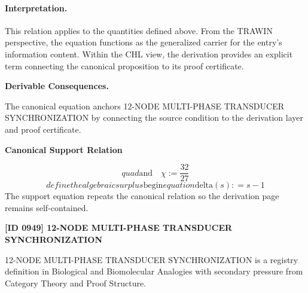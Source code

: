 \paragraph{Interpretation.}
This relation applies to the quantities defined above. From the TRAWIN perspective, the equation functions as the generalized carrier for the entry’s information content. Within the CHL view, the derivation provides an explicit term connecting the canonical proposition to its proof certificate.

\par\vspace{0.35em}
\noindent\textbf{Derivable Consequences.}\quad
\begingroup
\footnotesize
\raggedright
The canonical equation anchors 12-NODE MULTI-PHASE TRANSDUCER SYNCHRONIZATION by connecting the source condition to the derivation layer and proof certificate.
\par\endgroup

\noindent\textbf{Canonical Support Relation}\par
\[
quad \text{and}\quad \chi := \frac{32}{27}
\]
\[
define the algebraic surplus \mathrm{begin}{equation} \mathrm{delta}(s) : =s-1
\]
\noindent The support equation repeats the canonical relation so the derivation page remains self-contained.\par

\clearpage
\noindent\textbf{[ID 0949] 12-NODE MULTI-PHASE TRANSDUCER SYNCHRONIZATION}\par
\vspace{0.35em}
\begingroup\small
{}
12-NODE MULTI-PHASE TRANSDUCER SYNCHRONIZATION is a registry definition in Biological and Biomolecular Analogies with secondary pressure from Category Theory and Proof Structure.

